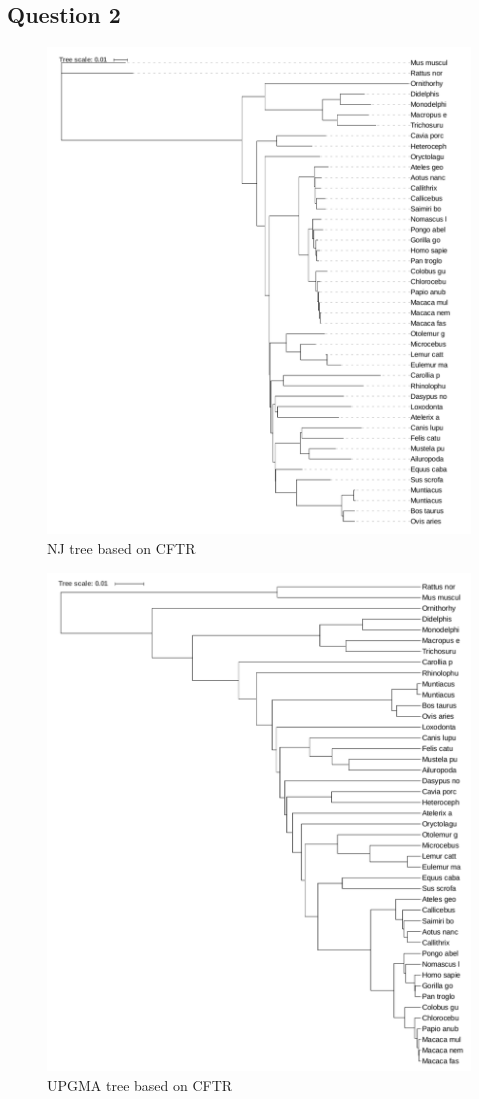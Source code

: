 \documentclass[]{article}
\begin{document}
\subsection{Question 2}
\begin{figure}[h]
	\includegraphics*[width = 0.9\linewidth]{NJ_CFTR.pdf}
	\caption{NJ tree based on CFTR}
\end{figure}

\begin{figure}[!h]
	\includegraphics*[width = \linewidth]{UPGMA_CFTR.pdf}
	\caption{UPGMA tree based on CFTR}
\end{figure}
\end{document}
